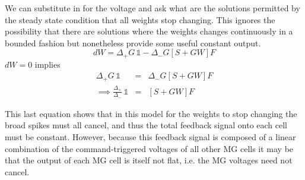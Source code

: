 \documentclass[11pt]{article}
\begin{document}
We can substitute in for the voltage and ask what are the solutions permitted by the steady state condition that all weights stop changing. This ignores the possibility that there are solutions where the weights changes continuously in a bounded fashion but nonetheless provide some useful constant output.
\begin{equation}
	dW = \Delta_{+} G\,\mathbb{1} - \Delta_{-} G\left[ S + GW \right] F
\end{equation}
$dW =0 $ implies
\begin{eqnarray*}
	\Delta_{+} G\,\mathbb{1} &=& \Delta_{-} G\left[ S + GW \right] F \\
	\implies \frac{\Delta_{+}}{\Delta_{-}} \, \mathbb{1} &=& \left[ S + GW \right] F
\end{eqnarray*}

This last equation shows that in this model for the weights to stop changing the broad spikes must all cancel, and thus the total feedback signal onto each cell must be constant. However, because this feedback signal is composed of a linear combination of the command-triggered voltages of all other MG cells it may be that the output of each MG cell is itself not flat, i.e. the MG voltages need not cancel. 
\end{document}
